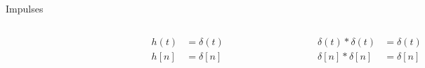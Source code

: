 \begin{frame}{Impulses}


    {
        \begin{columns}
                \begin{figure}
                    \centering
                    
                    \caption{}\label{fi:sys_for_operational_def_1}
                \end{figure}

                \begin{figure}
                    \centering
                    
                    \caption{}\label{fi:sys_for_operational_def_2}
                \end{figure}
                \pause
                {
                \begin{align*}
                  h(t) &= \delta(t) \\
                  h[n] &= \delta[n]
                \end{align*}
                }
                {
                    \vspace{0.5in}
                }
                \pause
                \begin{figure}
                    \centering
                    
                    \caption{}\label{fi:sys_for_operational_def_3}
                \end{figure}
                \pause
                {
                \begin{align*}
                   \delta(t)\ast  \delta(t) &= \delta(t) \\
                    \delta[n] \ast \delta[n] &= \delta[n]
                \end{align*}
                }
                {
                    \vspace{0.5in}
                }
                \pause
                \begin{figure}
                    \centering
                    
                    \caption{}\label{fi:sys_for_operational_def_4}
                \end{figure}
        \end{columns}
    }
\end{frame}

